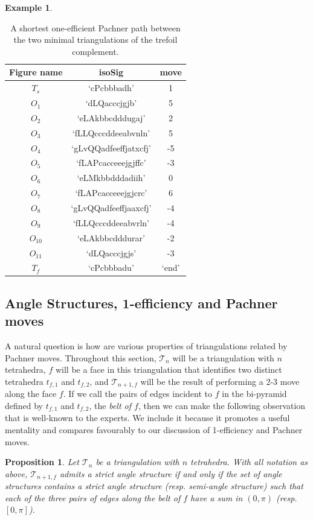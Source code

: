 \documentclass[12pt,reqno]{amsart}  %
\newtheorem{prop}[thm]{Proposition}
\theoremstyle{definition}
\newtheorem{ex}[thm]{Example}
\theoremstyle{remark}
\newcommand{\T}{\mathcal{T}}
\begin{document}
\begin{ex}
\begin{table}
\begin{tabular}{|c|c|c|}
\hline
Figure name & isoSig & move \\
\hline
$T_s$ & `cPcbbbadh' & 1\\ 
\hline
$O_1$ & `dLQacccjgjb' & 5\\ 
\hline
$O_2$ & `eLAkbbcdddugaj' & 2\\
\hline
$O_3$ & `fLLQcccddeeabvnln'& 5\\ 
\hline
$O_4$ & `gLvQQadfeeffjatxcfj' & -5\\ 
\hline
$O_5$ & `fLAPcacceeejgjffc' & -3 \\
\hline
$O_6$ & `eLMkbbdddadiih' & 0\\
\hline
$O_7$ & `fLAPcacceeejgjcrc' & 6\\
\hline
$O_8$ & `gLvQQadfeeffjaaxcfj'& -4\\  
\hline
$O_9$ &`fLLQcccddeeabvrln'& -4\\ 
\hline
$O_{10}$ & `eLAkbbcdddurar'& -2 \\
\hline
$O_{11}$ & `dLQacccjgjs'&-3 \\
\hline
$T_f$ & `cPcbbbadu' & `end'\\
\hline
\end{tabular}
\caption{\label{tab:ppOETrefoil} A shortest one-efficient Pachner path 
between the two minimal triangulations of the trefoil complement.}
\end{table}
\end{ex}

\subsection{Angle Structures, 1-efficiency and Pachner moves}

A natural question is how are various properties of triangulations related 
by Pachner moves. Throughout this section, $\T_n$ will be a triangulation 
with $n$ tetrahedra, $f$ will be a face in this triangulation that 
identifies two distinct tetrahedra $t_{f,1}$ and $t_{f,2}$, and $\T_{n+1,f}$ 
will be the result of performing a 2-3 move along the face $f$. If we call 
the pairs of edges incident to $f$ in the bi-pyramid defined by $t_{f,1}$ 
and $t_{f,2}$, the \emph{belt of $f$}, then we can make the following 
observation that is well-known to the experts. We include it because it 
promotes a useful mentality and compares favourably to our discussion of 
1-efficiency and Pachner moves.

\begin{prop}
Let $\T_n$ be a triangulation with $n$ tetrahedra. With all notation as 
above, $\T_{n+1,f}$ admits a strict angle structure if and only if the set 
of angle structures contains a strict angle structure (resp. semi-angle 
structure) such that each of the three pairs of edges along the belt of 
$f$ have a sum in $(0,\pi)$ (resp. $[0,\pi]$).
\end{prop}
\end{document}
